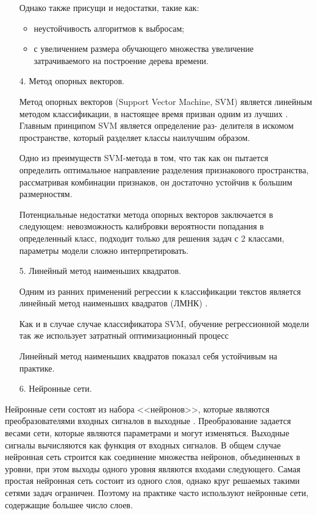 \begin{enumerate}
Однако также присущи и недостатки, такие как:
\begin{itemize}
\item неустойчивость алгоритмов к выбросам;
\item с увеличением размера обучающего множества увеличение затрачиваемого на построение дерева времени.
\end{itemize}

\item[4.] Метод опорных векторов.

Метод опорных векторов (Support Vector Machine, SVM) является линейным методом классификации, в настоящее время призван одним из лучших \cite{vectors}. Главным принципом SVM является определение раз- делителя в искомом пространстве, который разделяет классы наилучшим образом.

Одно из преимуществ SVM-метода в том, что так как он пытается определить оптимальное направление разделения признакового пространства, рассматривая комбинации признаков, он достаточно устойчив к большим размерностям. 

Потенциальные недостатки метода опорных векторов заключается в следующем: невозможность калибровки вероятности попадания в определенный класс, подходит только для решения задач с 2 классами, параметры модели сложно интерпретировать.

\item[5.] Линейный метод наименьших квадратов.

Одним из ранних применений регрессии к классификации текстов является линейный метод наименьших квадратов (ЛМНК) \cite{linear}.

Как и в случае случае классификатора SVM, обучение регрессионной модели так же использует затратный оптимизационный процесс

Линейный метод наименьших квадратов показал себя устойчивым на практике.

\item[6.] Нейронные сети.
\end{enumerate}

Нейронные сети состоят из набора <<нейронов>>, которые являются преобразователями входных сигналов в выходные \cite{neuron}. Преобразование задается весами сети, которые являются параметрами и могут изменяться. Выходные сигналы вычисляются как функция от входных сигналов. В общем случае нейронная сеть строится как соединение множества нейронов, объединенных в уровни, при этом выходы одного уровня являются входами следующего.
Самая простая нейронная сеть состоит из одного слоя, однако круг решаемых такими сетями задач ограничен. Поэтому на практике часто используют нейронные сети, содержащие большее число слоев.

